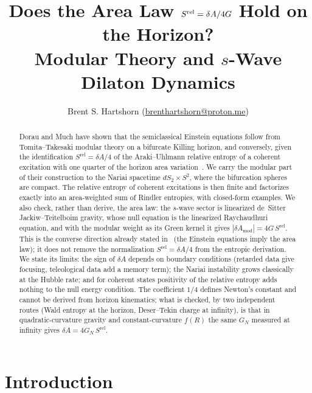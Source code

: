 \documentclass[11pt]{article}
\title{\textbf{Does the Area Law $\Srel=\delta A/4G$ Hold on the \Nariai{} Horizon?}\\ Modular Theory and $s$-Wave Dilaton Dynamics}
\author{Brent S. Hartshorn \orcidlink{0009-0004-2853-655X} (\url{brenthartshorn@proton.me})}
\newcommand{\Srel}{S^{\mathrm{rel}}}
\begin{document}
\maketitle

\begin{abstract}
Dorau and Much have shown that the semiclassical Einstein equations follow from Tomita--Takesaki modular theory on a bifurcate Killing horizon, and conversely, given the identification $\Srel = \delta A/4$ of the Araki--Uhlmann relative entropy of a coherent excitation with one quarter of the horizon area variation~\cite{DorauMuch}. We carry the modular part of their construction to the Nariai spacetime $dS_2\times S^2$, where the bifurcation spheres are compact. The relative entropy of coherent excitations is then finite and factorizes exactly into an area-weighted sum of Rindler entropies, with closed-form examples. We also check, rather than derive, the area law: the $s$-wave sector is linearized de~Sitter Jackiw--Teitelboim gravity, whose null equation is the linearized Raychaudhuri equation, and with the modular weight as its Green kernel it gives $|\delta A_{\mathrm{mod}}| = 4G\,\Srel$. This is the converse direction already stated in~\cite{DorauMuch} (the Einstein equations imply the area law); it does not remove the normalization $\Srel = \delta A/4$ from the entropic derivation. We state its limits: the sign of $\delta A$ depends on boundary conditions (retarded data give focusing, teleological data add a memory term); the Nariai instability grows classically at the Hubble rate; and for coherent states positivity of the relative entropy adds nothing to the null energy condition. The coefficient $1/4$ defines Newton's constant and cannot be derived from horizon kinematics; what is checked, by two independent routes (Wald entropy at the horizon, Deser--Tekin charge at infinity), is that in quadratic-curvature gravity and constant-curvature $f(R)$ the same $G_N$ measured at infinity gives $\delta A=4G_N\,\Srel$.
\end{abstract}

\section{Introduction}
\label{sec:intro}
\end{document}
